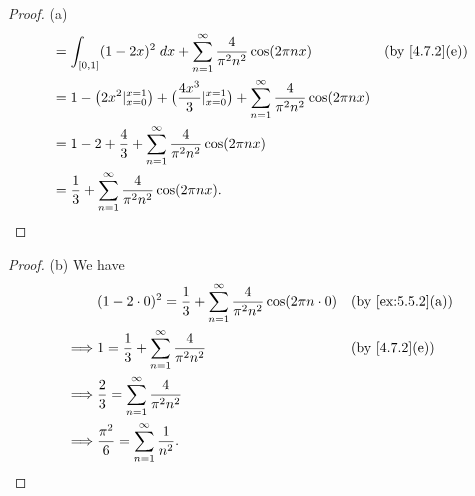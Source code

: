 \begin{proof}{(a)}
\begin{align*}
     & = \int_{[0, 1]} (1 - 2x)^2 \; dx + \sum_{n = 1}^\infty \dfrac{4}{\pi^2 n^2} \cos(2 \pi n x)                                                   &  & \text{(by \cref{4.7.2}(e))}   \\
     & = 1 - \big(2x^2|_{x = 0}^{x = 1}\big) + \big(\dfrac{4x^3}{3}|_{x = 0}^{x = 1}\big) + \sum_{n = 1}^\infty \dfrac{4}{\pi^2 n^2} \cos(2 \pi n x)                                    \\
     & = 1 - 2 + \dfrac{4}{3} + \sum_{n = 1}^\infty \dfrac{4}{\pi^2 n^2} \cos(2 \pi n x)                                                                                                \\
     & = \dfrac{1}{3} + \sum_{n = 1}^\infty \dfrac{4}{\pi^2 n^2} \cos(2 \pi n x).
  \end{align*}
\end{proof}

\begin{proof}{(b)}
  We have
  \begin{align*}
             & (1 - 2 \cdot 0)^2 = \dfrac{1}{3} + \sum_{n = 1}^\infty \dfrac{4}{\pi^2 n^2} \cos(2 \pi n \cdot 0) &  & \text{(by \cref{ex:5.5.2}(a))} \\
    \implies & 1 = \dfrac{1}{3} + \sum_{n = 1}^\infty \dfrac{4}{\pi^2 n^2}                                       &  & \text{(by \cref{4.7.2}(e))}    \\
    \implies & \dfrac{2}{3} = \sum_{n = 1}^\infty \dfrac{4}{\pi^2 n^2}                                                                               \\
    \implies & \dfrac{\pi^2}{6} = \sum_{n = 1}^\infty \dfrac{1}{n^2}.
  \end{align*}
\end{proof}

